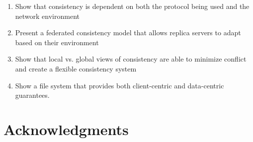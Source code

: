 \documentclass[letterpaper,twocolumn,10pt]{article}
\begin{document}
\begin{enumerate}
\item Show that consistency is dependent on both the protocol being used and the network environment
\item Present a federated consistency model that allows replica servers to adapt based on their environment
\item Show that local vs. global views of consistency are able to minimize conflict and create a flexible consistency system
\item Show a file system that provides both client-centric and data-centric guarantees.
\end{enumerate}

\section*{Acknowledgments}

{\footnotesize 
}

\end{document}
